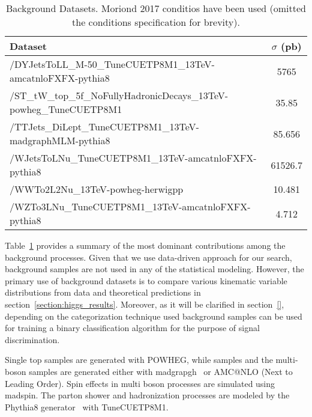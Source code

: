 \begin{table}[!h]
    \caption{Background Datasets. Moriond 2017 conditios have been used (omitted the conditions specification for brevity).}
    \label{table:higgs_data_backgrounddatasets}
    \begin{center}
        \begin{tabular}{ l  c}
            \hline
            Dataset & $\sigma$ (pb)\\
            \hline
            /DYJetsToLL\_M-50\_TuneCUETP8M1\_13TeV-amcatnloFXFX-pythia8 & 5765\\
            /ST\_tW\_top\_5f\_NoFullyHadronicDecays\_13TeV-powheg\_TuneCUETP8M1 & 35.85\\
            /TTJets\_DiLept\_TuneCUETP8M1\_13TeV-madgraphMLM-pythia8 & 85.656\\
            /WJetsToLNu\_TuneCUETP8M1\_13TeV-amcatnloFXFX-pythia8 & 61526.7\\
            /WWTo2L2Nu\_13TeV-powheg-herwigpp & 10.481\\
            /WZTo3LNu\_TuneCUETP8M1\_13TeV-amcatnloFXFX-pythia8 & 4.712\\
            \hline
        \end{tabular}
    \end{center}
\end{table}

Table~\ref{table:higgs_data_backgrounddatasets} provides a summary of the most dominant contributions among the background processes. Given that we use data-driven approach for our search, background samples are not used in any of the statistical modeling. However, the primary use of background datasets is to compare various kinematic variable distributions from data and theoretical predictions in section~\ref{section:higgs_results}. Moreover, as it will be clarified in section~\ref{}, depending on the categorization technique used background samples can be used for training a binary classification algorithm for the purpose of signal discrimination.

Single top samples are generated with {\sc POWHEG}, while \ttbar samples and the multi-boson samples are generated either with {\sc madgrapgh}~\cite{Alwall:2011uj} or {AMC@NLO (Next to Leading Order)}. Spin effects in multi boson processes are simulated using madspin. The parton shower and hadronization processes are modeled by the {\sc Phythia8} generator~\cite{Sjostrand:2007gs} with TuneCUETP8M1.


